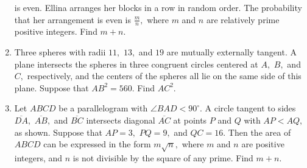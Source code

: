 \documentclass{article}
\begin{document}
\begin{enumerate}[label=\arabic*., itemsep=0.5em]
is even. Ellina arranges her blocks in a row in random order. The probability that her arrangement is even is $\frac{m}{n},$ where $m$ and $n$ are relatively prime positive integers. Find $m+n.$\par \vspace{0.5em}\item Three spheres with radii $11,$ $13,$ and $19$ are mutually externally tangent. A plane intersects the spheres in three congruent circles centered at $A,$ $B,$ and $C,$ respectively, and the centers of the spheres all lie on the same side of this plane. Suppose that $AB^2 = 560.$ Find $AC^2.$\par \vspace{0.5em}\item Let $ABCD$ be a parallelogram with $\angle BAD < 90^\circ.$ A circle tangent to sides $\overline{DA},$ $\overline{AB},$ and $\overline{BC}$ intersects diagonal $\overline{AC}$ at points $P$ and $Q$ with $AP < AQ,$ as shown. Suppose that $AP=3,$ $PQ=9,$ and $QC=16.$ Then the area of $ABCD$ can be expressed in the form $m\sqrt{n},$ where $m$ and $n$ are positive integers, and $n$ is not divisible by the square of any prime. Find $m+n.$



\end{enumerate}
\end{document}
